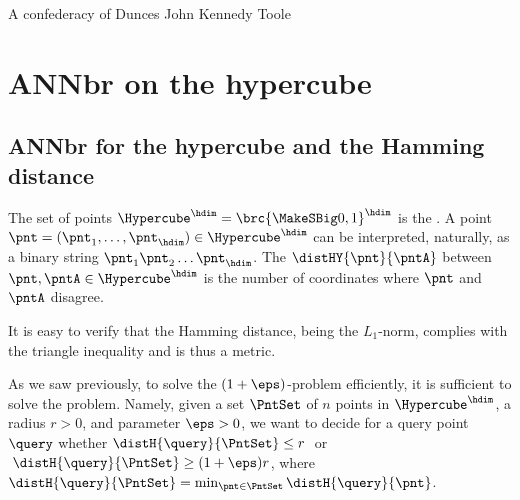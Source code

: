%
%


\makeatletter
{}
\makeatother
\ifx\bookMode\undefined%
\fi
{}




\ChapterPrefix{}
\ChapterGen{}

%
{A confederacy of Dunces}%
{John Kennedy Toole}




\section{ANN{}br on the hypercube}

\subsection{ANN{}br for the hypercube and the Hamming distance}

\begin{defn}
    The set of points $\Hypercube^\hdim = \brc{ \MakeSBig 0,1}^\hdim$
    is the . A point
    $\pnt = (\pnt_1, \ldots, \pnt_\hdim) \in \Hypercube^\hdim$ can be
    interpreted, naturally, as a binary string
    $\pnt_1\pnt_2 \ldots \pnt_\hdim$. The 
    $\distHY{\pnt}{\pntA}$ between $\pnt, \pntA \in \Hypercube^\hdim$
    is the number of coordinates where $\pnt$ and $\pntA$ disagree.

    It is easy to verify that the Hamming distance, being the
    $L_1$-norm, complies with the triangle inequality and is thus a
    metric.
\end{defn}

As we saw previously, to solve the $(1+\eps)$-\ANNbr problem
efficiently, it is sufficient to solve the  problem. Namely, given a set $\PntSet$ of $n$ points in
$\Hypercube^\hdim$, a radius $r>0$, and parameter $\eps >0$, we want
to decide for a query point $\query$ whether
$\distH{\query}{\PntSet} \leq r\;$ or
$\;\distH{\query}{\PntSet} \geq (1+\eps)r$, where
$\distH{\query}{\PntSet} = \min_{\pnt \in \PntSet}
\distH{\query}{\pnt}$.

